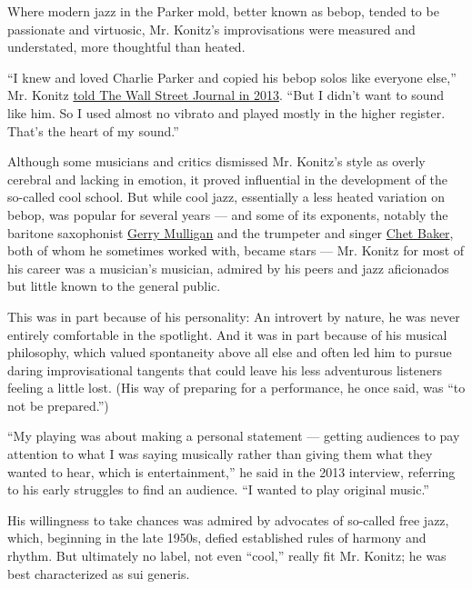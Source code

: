 Where modern jazz in the Parker mold, better known as bebop, tended to
be passionate and virtuosic, Mr. Konitz's improvisations were measured
and understated, more thoughtful than heated.

``I knew and loved Charlie Parker and copied his bebop solos like
everyone else,'' Mr. Konitz
\href{https://www.wsj.com/articles/jazzs-king-of-coola-cool-65-1378152141}{told
The Wall Street Journal in 2013}. ``But I didn't want to sound like him.
So I used almost no vibrato and played mostly in the higher register.
That's the heart of my sound.''

Although some musicians and critics dismissed Mr. Konitz's style as
overly cerebral and lacking in emotion, it proved influential in the
development of the so-called cool school. But while cool jazz,
essentially a less heated variation on bebop, was popular for several
years --- and some of its exponents, notably the baritone saxophonist
\href{https://www.nytimes3xbfgragh.onion/1996/01/21/nyregion/gerry-mulligan-a-baritone-saxophonist-and-cool-school-jazz-pioneerdies-at-68.html}{Gerry
Mulligan} and the trumpeter and singer
\href{https://www.nytimes3xbfgragh.onion/1988/05/14/obituaries/chet-baker-jazz-trumpeter-dies-at-59-in-a-fall.html}{Chet
Baker}, both of whom he sometimes worked with, became stars --- Mr.
Konitz for most of his career was a musician's musician, admired by his
peers and jazz aficionados but little known to the general public.

This was in part because of his personality: An introvert by nature, he
was never entirely comfortable in the spotlight. And it was in part
because of his musical philosophy, which valued spontaneity above all
else and often led him to pursue daring improvisational tangents that
could leave his less adventurous listeners feeling a little lost. (His
way of preparing for a performance, he once said, was ``to not be
prepared.'')

``My playing was about making a personal statement --- getting audiences
to pay attention to what I was saying musically rather than giving them
what they wanted to hear, which is entertainment,'' he said in the 2013
interview, referring to his early struggles to find an audience. ``I
wanted to play original music.''

His willingness to take chances was admired by advocates of so-called
free jazz, which, beginning in the late 1950s, defied established rules
of harmony and rhythm. But ultimately no label, not even ``cool,''
really fit Mr. Konitz; he was best characterized as sui generis.

